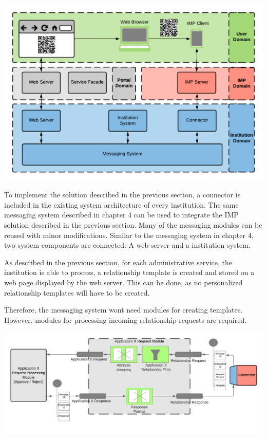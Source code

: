 \begin{center}
    \includegraphics[scale=0.6]{Diagrams/Integration Architecture 2/Overview.pdf}
\end{center}

To implement the solution described in the previous section, a connector is included in the existing system architecture of every institution. The same messaging system described in chapter 4 can be used to integrate the IMP solution described in the previous section. Many of the messaging modules can be reused with minor modifications. Similar to the messaging system in chapter 4, two system components are connected: A web server and a institution system.

As described in the previous section, for each administrative service, the institution is able to process, a relationship template is created and stored on a web page displayed by the web server. This can be done, as no personalized relationship templates will have to be created. 

Therefore, the messaging system wont need modules for creating templates. However, modules for processing incoming relationship requests are required.

\begin{center}
    \includegraphics[scale=0.6]{Diagrams/Integration Architecture 2/Application Request Module.pdf}
\end{center}

